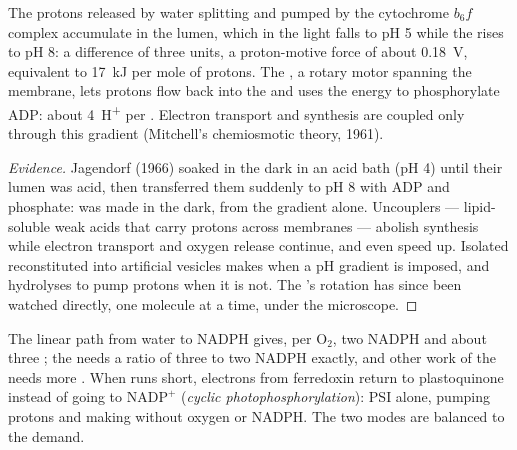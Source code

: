 \begin{theorem}\label{thm:b1:photosynthesis:chemiosmosis}
The protons released by water splitting and pumped by the cytochrome
$b_6f$ complex accumulate in the  lumen, which in the light
falls to pH 5 while the  rises to pH 8: a difference of three
units, a proton-motive force of about \qty{0.18}{V}, equivalent to
\qty{17}{kJ} per mole of protons. The \emph{}, a
rotary motor spanning the  membrane, lets protons flow back
into the  and uses the energy to phosphorylate ADP: about
\qty{4}{H^+} per . Electron transport and  synthesis are coupled
only through this gradient (Mitchell's chemiosmotic theory, 1961).
\end{theorem}
\begin{proof}[Evidence]
Jagendorf (1966) soaked  in the dark in an acid bath (pH 4)
until their lumen was acid, then transferred them suddenly to pH 8
with ADP and phosphate:  was made in the dark, from the gradient
alone. Uncouplers --- lipid-soluble weak acids that carry protons
across membranes --- abolish  synthesis while electron transport
and oxygen release continue, and even speed up. Isolated 
reconstituted into artificial vesicles makes  when a pH gradient is
imposed, and hydrolyses  to pump protons when it is not. The
's rotation has since been watched directly, one molecule at a
time, under the microscope.
\end{proof}

\begin{example}\label{ex:b1:photosynthesis:cyclic}
The linear path from water to NADPH gives, per $\mathrm{O_2}$, two
NADPH and about three ; the  needs a ratio of three 
to two NADPH exactly, and other work of the  needs more .
When  runs short, electrons from ferredoxin return to plastoquinone
instead of going to $\mathrm{NADP^+}$ (\emph{cyclic
photophosphorylation}): PSI alone, pumping protons and making 
without oxygen or NADPH. The two modes are balanced to the demand.
\end{example}

